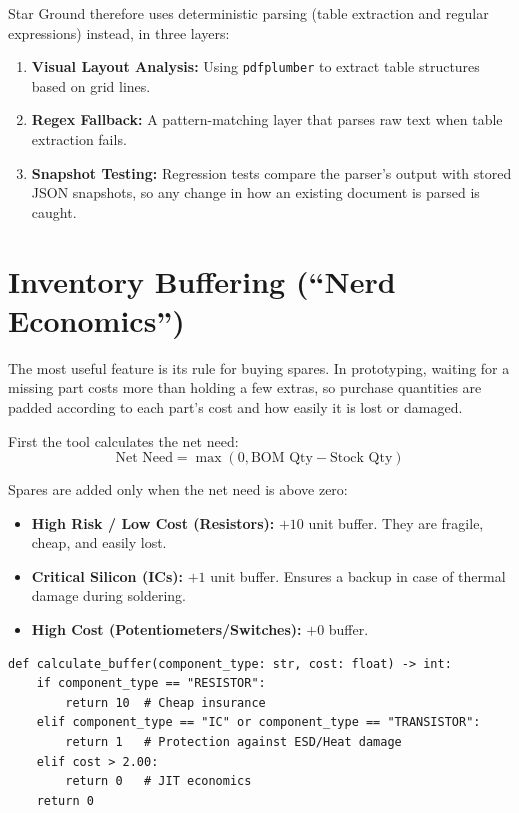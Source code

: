\documentclass[11pt, a4paper]{report}
\begin{document}
Star Ground therefore uses deterministic parsing (table extraction and regular expressions) instead, in three layers:
\begin{enumerate}
  \item \textbf{Visual Layout Analysis:} Using \texttt{pdfplumber} to extract table structures based on grid lines.\cite{pdfplumber}
  \item \textbf{Regex Fallback:} A pattern-matching layer that parses raw text when table extraction fails.
  \item \textbf{Snapshot Testing:} Regression tests compare the parser's output with stored JSON snapshots, so any change in how an existing document is parsed is caught. \cite{pytest,pytestregtest}

\end{enumerate}

\section{Inventory Buffering (``Nerd Economics'')}
The most useful feature is its rule for buying spares. In prototyping, waiting for a missing part costs more than holding a few extras, so purchase quantities are padded according to each part's cost and how easily it is lost or damaged.

First the tool calculates the net need:
\begin{equation}
  \text{Net Need} = \max(0, \text{BOM Qty} - \text{Stock Qty})
\end{equation}

Spares are added only when the net need is above zero:
\begin{itemize}
  \item \textbf{High Risk / Low Cost (Resistors):} $+10$ unit buffer. They are fragile, cheap, and easily lost.
  \item \textbf{Critical Silicon (ICs):} $+1$ unit buffer. Ensures a backup in case of thermal damage during soldering.
  \item \textbf{High Cost (Potentiometers/Switches):} $+0$ buffer.
\end{itemize}

\begin{lstlisting}[caption=Heuristic Buffering Logic]
def calculate_buffer(component_type: str, cost: float) -> int:
    if component_type == "RESISTOR":
        return 10  # Cheap insurance
    elif component_type == "IC" or component_type == "TRANSISTOR":
        return 1   # Protection against ESD/Heat damage
    elif cost > 2.00:
        return 0   # JIT economics
    return 0
\end{lstlisting}
\end{document}
